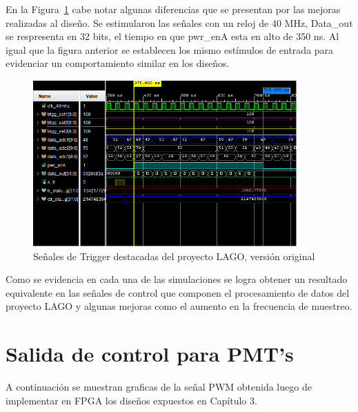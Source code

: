 En  la Figura~\ref{trigerlago} cabe notar algunas diferencias que se presentan por las mejoras realizadas al diseño. Se estimularon las señales con un reloj de 40 MHz, Data\_out se respresenta en 32 bits, el tiempo en que pwr\_enA esta en alto de 350 ns. Al igual que la figura anterior se establecen los mismo estímulos de entrada para evidenciar un comportamiento similar en los diseños.
\begin{figure}[H]
\includegraphics[width=0.9\textwidth]{Figs/trigerviejo.PNG} 
\centering
\caption{Señales de Trigger destacadas del proyecto LAGO, versión original}
\label{trigerlago}
\end{figure}

Como se evidencia en cada una de las simulaciones se logra obtener un resultado equivalente en las señales de control que componen el procesamiento de datos del proyecto LAGO y algunas mejoras como el aumento en la frecuencia de muestreo.

\section{\textbf{Salida de control para PMT's}}
A continuación se muestran graficas de la señal PWM obtenida luego de implementar en FPGA los diseños expuestos en Capítulo 3.

